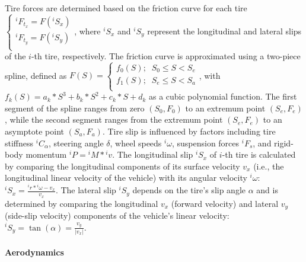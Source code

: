 Tire forces are determined based on the friction curve for each tire $\left\{\begin{matrix} {^iF_{t_x}} = F(^iS_x) \\{^iF_{t_y}} = F(^iS_y) \\ \end{matrix}\right.$, where $^iS_x$ and $^iS_y$ represent the longitudinal and lateral slips of the $i$-th tire, respectively. The friction curve is approximated using a two-piece spline, defined as $F(S) = \left\{\begin{matrix} f_0(S); \;\; S_0 \leq S < S_e \\ f_1(S); \;\; S_e \leq S < S_a \\ \end{matrix}\right.$, with $f_k(S) = a_k*S^3+b_k*S^2+c_k*S+d_k$ as a cubic polynomial function. The first segment of the spline ranges from zero $(S_0,F_0)$ to an extremum point $(S_e,F_e)$, while the second segment ranges from the extremum point $(S_e, F_e)$ to an asymptote point $(S_a, F_a)$. Tire slip is influenced by factors including tire stiffness $^iC_\alpha$, steering angle $\delta$, wheel speeds $^i\omega$, suspension forces $^iF_s$, and rigid-body momentum ${^iP}={^iM}*{^iv}$. The longitudinal slip $^iS_x$ of $i$-th tire is calculated by comparing the longitudinal components of its surface velocity $v_x$ (i.e., the longitudinal linear velocity of the vehicle) with its angular velocity $^i\omega$: ${^iS_x} = \frac{{^ir}*{^i\omega}-v_x}{v_x}$. The lateral slip $^iS_y$ depends on the tire's slip angle $\alpha$ and is determined by comparing the longitudinal $v_x$ (forward velocity) and lateral $v_y$ (side-slip velocity) components of the vehicle's linear velocity: ${^iS_y} = \tan(\alpha) = \frac{v_y}{\left| v_x \right|}$.

\paragraph{Aerodynamics}
\label{Aerodynamics}

